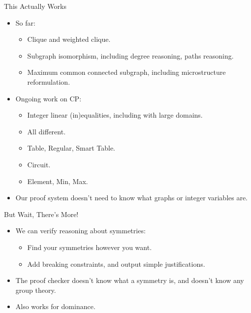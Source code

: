 \documentclass[aspectratio=169,compress,10pt]{beamer}
\begin{document}
\begin{frame}{This Actually Works}
    \begin{itemize}
        \item So far:
            \begin{itemize}
                \item Clique and weighted clique.
                \item Subgraph isomorphism, including degree reasoning, paths reasoning.
                \item Maximum common connected subgraph, including microstructure reformulation.
            \end{itemize}
        \item Ongoing work on CP:
            \begin{itemize}
                \item Integer linear (in)equalities, including with large domains.
                \item All different.
                \item Table, Regular, Smart Table.
                \item Circuit.
                \item Element, Min, Max.
            \end{itemize}
        \item Our proof system doesn't need to know what graphs or integer variables are.
    \end{itemize}
\end{frame}

\begin{frame}{But Wait, There's More!}
    \begin{itemize}
        \item We can verify reasoning about symmetries:
            \begin{itemize}
                \item Find your symmetries however you want.
                \item Add breaking constraints, and output simple justifications.
            \end{itemize}
        \item The proof checker doesn't know what a symmetry is, and doesn't know
            any group theory.
        \item Also works for dominance.
    \end{itemize}
\end{frame}
\end{document}
